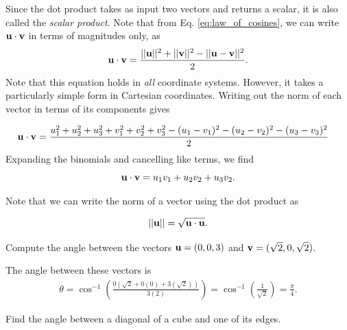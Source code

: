 \documentclass[12pt,letterpaper,reqno]{article}
\numberwithin{equation}{section}
\newcommand{\ti}[1]{\textit{#1}}
\begin{document}
Since the dot product takes as input two vectors and returns a scalar, it is also called the \ti{scalar product}. Note that from Eq. \eqref{eq:law_of_cosines}, we can write ${\bf u}\cdot {\bf v}$ in terms of magnitudes only, as 
\begin{equation}\label{eq:dot_product_magnitudes}
	{\bf u}\cdot {\bf v}=\frac{||{\bf u}||^2+||{\bf v}||^2-||{\bf u}-{\bf v}||^2}{2}.
\end{equation}
Note that this equation holds in \ti{all} coordinate systems. However, it takes a particularly simple form in Cartesian coordinates. Writing out the norm of each vector in terms of its components gives

\begin{align*}
	{\bf u}\cdot {\bf v}&=\frac{u_1^2+u_2^2+u_3^2+v_1^2+v_2^2+v_3^2-(u_1-v_1)^2-(u_2-v_2)^2-(u_3-v_3)^2}{2}
\end{align*}
Expanding the binomials and cancelling like terms, we find
\begin{equation}
	{\bf u}\cdot {\bf v}=u_1v_1+u_2v_2+u_3v_2.
\end{equation}

Note that we can write the norm of a vector using the dot product as 

\begin{equation}\label{eq:dot_product_norm}
	||{\bf u}||=\sqrt{{\bf u}\cdot {\bf u}}.
\end{equation}

\begin{exercise}
Compute the angle between the vectors ${\bf u}=(0,0,3)$ and ${\bf v}=(\sqrt{2},0,\sqrt{2})$.	
\end{exercise}

{\color{red}  The angle between these vectors is
\begin{align*}
	\theta=\cos^{-1}\left(\frac{0(\sqrt{2}+0(0)+3(\sqrt{2}))}{3(2)}\right)=\cos^{-1}\left(\frac{1}{\sqrt{2}}\right)=\frac{\pi}{4}.
\end{align*}}

\begin{exercise}
	Find the angle between a diagonal of a cube and one of its edges.
\end{exercise}
\end{document}
